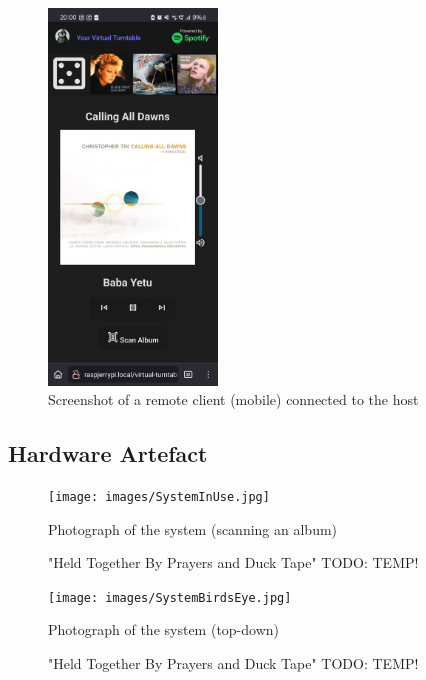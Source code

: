             \begin{figure}[h]
                \centering
                \includegraphics[width=0.4\textwidth]{images/screenshots/PHONE.jpg}
                \caption{Screenshot of a remote client (mobile) connected to the host}
                \label{fig:phone}
            \end{figure}
        
        \subsection{Hardware Artefact}
    
            \begin{figure}
                \centering
                \texttt{[image: images/SystemInUse.jpg]}
                \caption{Photograph of the system (scanning an album)}
                \label{fig:SystemInUse}
                \caption*{"Held Together By Prayers and Duck Tape" TODO: TEMP!}
            \end{figure}
    
            \begin{figure}
                \centering
                \texttt{[image: images/SystemBirdsEye.jpg]}
                \caption{Photograph of the system (top-down)}
                \label{fig:SystemTopDown}
                \caption*{"Held Together By Prayers and Duck Tape" TODO: TEMP!}
            \end{figure}
    

